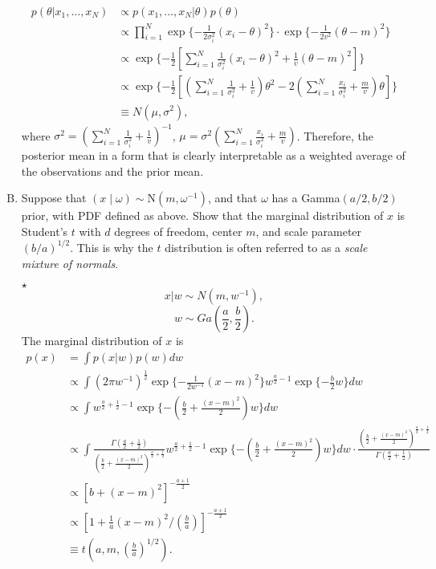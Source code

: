 \documentclass[11pt]{article}
\newcommand{\jie}{$\star$ }
\newcommand{\N}{\mbox{N}}
\begin{document}
\begin{enumerate}[(A)]
\begin{align*}
    p(\theta|x_1,\dots,x_N) &\propto p(x_1,\dots,x_N |\theta) p(\theta) \\
    &\propto \prod_{i=1}^N \exp \{-\frac{1}{2\sigma_i^2} (x_i-\theta)^2\} \cdot \exp \{-\frac{1}{2v^2} (\theta-m)^2\} \\
    &\propto \exp \{ -\frac{1}{2} [\sum_{i=1}^N \frac{1}{\sigma_i^2} (x_i-\theta)^2 + \frac{1}{v} (\theta-m)^2] \} \\
    &\propto \exp \{ -\frac{1}{2} [(\sum_{i=1}^N \frac{1}{\sigma_i^2} + \frac{1}{v}) \theta^2 - 2 (\sum_{i=1}^N \frac{x_i}{\sigma_i^2} + \frac{m}{v})\theta] \} \\
    &\equiv N(\mu, \sigma^2),
\end{align*}
where $\sigma^2 = (\sum_{i=1}^N \frac{1}{\sigma_i^2} + \frac{1}{v} )^{-1}$, $\mu = \sigma^2 (\sum_{i=1}^N \frac{x_i}{\sigma_i^2} + \frac{m}{v})$.
Therefore, the posterior mean in a form that is clearly interpretable as a weighted average of the observations and the prior mean.

\bigskip

\item Suppose that $(x \mid \omega) \sim \N(m, \omega^{-1})$, and that $\omega$ has a Gamma$(a/2, b/2)$ prior, with PDF defined as above.  Show that the marginal distribution of $x$ is Student's $t$ with $d$ degrees of freedom, center $m$, and scale parameter $(b/a)^{1/2}$.  This is why the $t$ distribution is often referred to as a \textit{scale mixture of normals}.

\bigskip

\jie
$$x|w \sim N(m,w^{-1}),$$
$$w \sim Ga(\frac{a}{2}, \frac{b}{2}).$$
The marginal distribution of $x$ is
\begin{align*}
    p(x) &= \int p(x|w) p(w) dw \\
    &\propto \int (2\pi w^{-1})^{\frac{1}{2}} \exp \{ -\frac{1}{2w^{-1}} (x-m)^2 \} w^{\frac{a}{2}-1} \exp \{-\frac{b}{2}w\} dw \\
    &\propto \int w^{\frac{a}{2}+\frac{1}{2} -1} \exp \{-(\frac{b}{2}+\frac{(x-m)^2}{2})w \} dw \\
    &\propto \int \frac{\Gamma(\frac{a}{2} + \frac{1}{2})}{(\frac{b}{2} + \frac{(x-m)^2}{2} )^{\frac{a}{2}+\frac{1}{2}} } w^{\frac{a}{2}+\frac{1}{2} -1} \exp \{-(\frac{b}{2}+\frac{(x-m)^2}{2})w \} dw \cdot \frac{(\frac{b}{2} + \frac{(x-m)^2}{2} )^{\frac{a}{2}+\frac{1}{2}} }{\Gamma(\frac{a}{2} + \frac{1}{2})} \\
    &\propto [b+(x-m)^2]^{-\frac{a+1}{2}} \\
    &\propto [1+\frac{1}{a}(x-m)^2/(\frac{b}{a})]^{-\frac{a+1}{2}} \\
    &\equiv t(a,m,(\frac{b}{a})^{1/2}).
\end{align*}

\bigskip

\end{enumerate}
\end{document}

